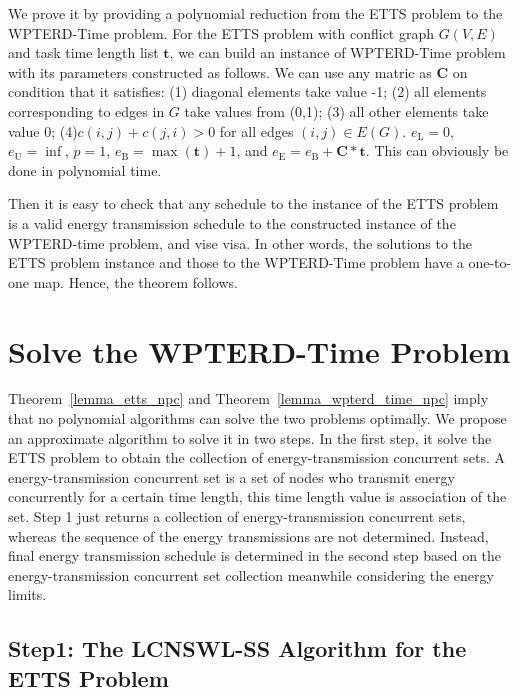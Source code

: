 \documentclass[journal,10pt]{IEEEtran}
\begin{document}
\begin{IEEEproof}
We prove it by providing a polynomial reduction from the ETTS problem to the WPTERD-Time problem. For the ETTS problem with conflict graph $G(V,E)$ and task time length list $\mathbf{t}$, we can build an instance of WPTERD-Time problem with its parameters constructed as follows. We can use any matric as $\mathbf{C}$ on condition that it satisfies: (1) diagonal elements take value -1; (2) all elements corresponding to edges in $G$ take values from (0,1); (3) all other elements take value 0; (4)$c(i,j){+}c(j,i){>}0$ for all edges $(i,j){\in}E(G)$. $e_\text{L}{=}0$, $e_\text{U}{=}\inf$, $p{=}1$, $e_\text{B}{=}\max(\mathbf{t}){+}1$, and $e_\text{E}{=}e_\text{B}{+}\mathbf{C}{*}\mathbf{t}$. This can obviously be done in polynomial time.

Then it is easy to check that any schedule to the instance of the ETTS problem is a valid energy transmission schedule to the constructed instance of the WPTERD-time problem, and vise visa. In other words, the solutions to the ETTS problem instance and those to the WPTERD-Time problem have a one-to-one map. Hence, the theorem follows.
\end{IEEEproof}

\section{Solve the WPTERD-Time Problem}
\label{sec_solve_wpter_time}

Theorem~\ref{lemma_etts_npc} and Theorem~\ref{lemma_wpterd_time_npc} imply that no polynomial algorithms can solve the two problems optimally. We propose an approximate algorithm to solve it in two steps. In the first step, it solve the ETTS problem to obtain the collection of energy-transmission concurrent sets. A energy-transmission concurrent set is a set of nodes who transmit energy concurrently for a certain time length, this time length value is association of the set. Step 1 just returns a collection of energy-transmission concurrent sets, whereas the sequence of the energy transmissions are not determined. Instead, final energy transmission schedule is determined in the second step based on the energy-transmission concurrent set collection meanwhile considering the energy limits.

\subsection{Step1: The LCNSWL-SS Algorithm for the ETTS Problem}
\end{document}
